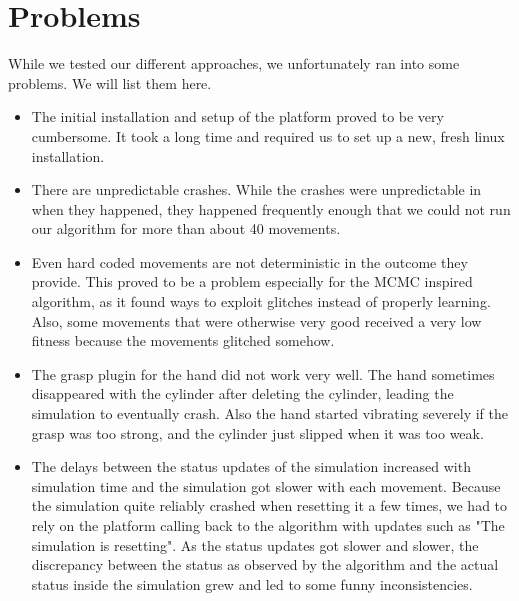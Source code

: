 \section{Problems} \label{sec:problems}

While we tested our different approaches, we unfortunately ran into some problems. We will list them here.
\begin{itemize}
	\item The initial installation and setup of the platform proved to be very cumbersome. It took a long time and required us to set up a new, fresh linux installation.
	\item There are unpredictable crashes. While the crashes were unpredictable in when they happened, they happened frequently enough that we could not run our algorithm for more than about 40 movements. 
	\item Even hard coded movements are not deterministic in the outcome they provide. This proved to be a problem especially for the MCMC inspired algorithm, as it found ways to exploit glitches instead of properly learning. Also, some movements that were otherwise very good received a very low fitness because the movements glitched somehow.
	\item The grasp plugin for the hand did not work very well. The hand sometimes disappeared with the cylinder after deleting the cylinder, leading the simulation to eventually crash. Also the hand started vibrating severely if the grasp was too strong, and the cylinder just slipped when it was too weak.
	\item The delays between the status updates of the simulation increased with simulation time and the simulation got slower with each movement. Because the simulation quite reliably crashed when resetting it a few times, we had to rely on the platform calling back to the algorithm with updates such as "The simulation is resetting". As the status updates got slower and slower, the discrepancy between the status as observed by the algorithm and the actual status inside the simulation grew and led to some funny inconsistencies.
\end{itemize}